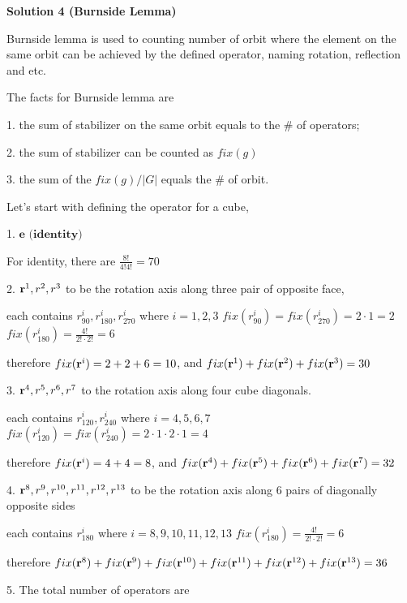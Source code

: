 \begin{enumerate}
 



\textbf{Solution 4 (Burnside Lemma)}

Burnside lemma is used to counting number of orbit where the element on the same orbit can be achieved by the defined operator, naming rotation, reflection and etc. 

 The facts for Burnside lemma are 

 1. the sum of stabilizer on the same orbit equals to the \# of operators; 

 2. the sum of stabilizer can be counted as $fix(g)$ 

 3. the sum of the $fix(g)/|G|$ equals the \# of orbit. 

 
Let's start with defining the operator for a cube, 

 1. $\textbf{e (identity)}$

 For identity, there are $\frac{8!}{4!4!} = 70$ 

 
2. ${\textbf r^{1}, r^{2}, r^{3}}$ to be the rotation axis along three pair of opposite face, 

 each contains $r^{i}_{90}, r^{i}_{180}, r^{i}_{270}$ where $i= 1, 2, 3$
$fix(r^{i}_{90}) = fix(r^{i}_{270}) = 2\cdot1 = 2$
$fix(r^{i}_{180}) = \frac{4!}{2!\cdot2!} = 6$

 therefore $fix(\textbf r^{i}) = 2+2+6 = 10$, and $fix(\textbf r^{1})+fix(\textbf r^{2})+fix(\textbf r^{3}) = 30$

 
3. ${\textbf r^{4}, r^{5}, r^{6}, r^{7}}$ to the rotation axis along four cube diagonals. 

 each contains $r^{i}_{120}, r^{i}_{240}$   where $i= 4, 5, 6, 7$
$fix(r^{i}_{120}) = fix(r^{i}_{240}) = 2\cdot1\cdot2\cdot1 = 4$

 therefore $fix(\textbf r^{i}) = 4+4 = 8$, and $fix(\textbf r^{4})+fix(\textbf r^{5})+fix(\textbf r^{6})+fix(\textbf r^{7}) = 32$

 


 4. ${\textbf r^{8}, r^{9}, r^{10}, r^{11}, r^{12}, r^{13}}$ to be the rotation axis along 6 pairs of diagonally opposite sides

 each contains $r^{i}_{180}$   where $i= 8, 9, 10, 11, 12, 13$
$fix(r^{i}_{180}) = \frac{4!}{2!\cdot2!} = 6$

 therefore $fix(\textbf r^{8})+fix(\textbf r^{9})+fix(\textbf r^{10})+fix(\textbf r^{11})+fix(\textbf r^{12})+fix(\textbf r^{13}) = 36$

 
5. The total number of operators are 


\end{enumerate}
